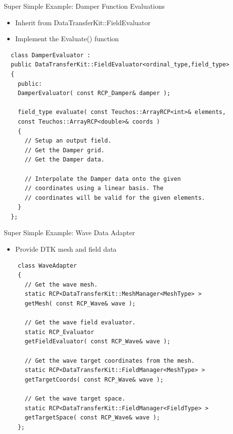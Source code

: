\documentclass{beamer}
\begin{document}
\begin{frame}[fragile]{Super Simple Example: Damper Function Evaluations}

  \begin{itemize}
  \item Inherit from DataTransferKit::FieldEvaluator
  \item Implement the Evaluate() function
  \end{itemize}
 
  \begin{lstlisting}
  class DamperEvaluator : 
  public DataTransferKit::FieldEvaluator<ordinal_type,field_type>
  {
    public:
    DamperEvaluator( const RCP_Damper& damper );

    field_type evaluate( const Teuchos::ArrayRCP<int>& elements,
    const Teuchos::ArrayRCP<double>& coords )
    {
      // Setup an output field.
      // Get the Damper grid.
      // Get the Damper data.

      // Interpolate the Damper data onto the given 
      // coordinates using a linear basis. The 
      // coordinates will be valid for the given elements.
    }
  };
  \end{lstlisting}

\end{frame}

\begin{frame}[fragile]{Super Simple Example: Wave Data Adapter}

  \begin{itemize}
  \item Provide DTK mesh and field data
  \end{itemize}
  
  \begin{lstlisting}
    class WaveAdapter
    {
      // Get the wave mesh.
      static RCP<DataTransferKit::MeshManager<MeshType> >
      getMesh( const RCP_Wave& wave );

      // Get the wave field evaluator.
      static RCP_Evaluator 
      getFieldEvaluator( const RCP_Wave& wave );

      // Get the wave target coordinates from the mesh.
      static RCP<DataTransferKit::FieldManager<MeshType> >
      getTargetCoords( const RCP_Wave& wave );

      // Get the wave target space.
      static RCP<DataTransferKit::FieldManager<FieldType> >
      getTargetSpace( const RCP_Wave& wave );
    };
  \end{lstlisting}

\end{frame}
\end{document}
